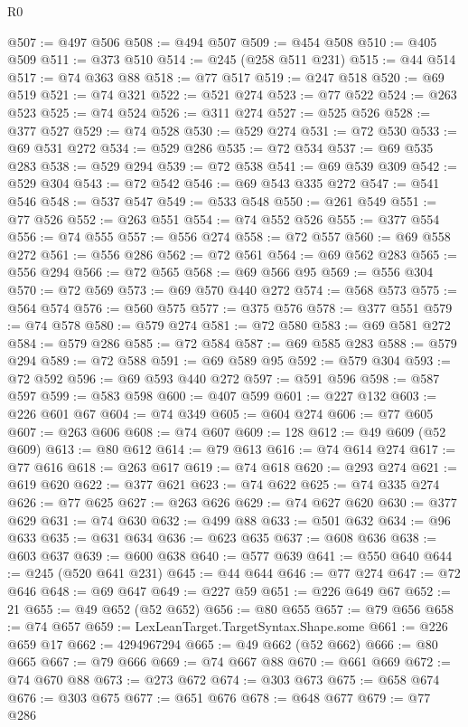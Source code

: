 \begin{lexlean}{R0}
\begin{coremodule}
@507 := @497 @506
@508 := @494 @507
@509 := @454 @508
@510 := @405 @509
@511 := @373 @510
@514 := @245 (@258 @511 @231)
@515 := @44 @514
@517 := @74 @363 @88
@518 := @77 @517
@519 := @247 @518
@520 := @69 @519
@521 := @74 @321
@522 := @521 @274
@523 := @77 @522
@524 := @263 @523
@525 := @74 @524
@526 := @311 @274
@527 := @525 @526
@528 := @377 @527
@529 := @74 @528
@530 := @529 @274
@531 := @72 @530
@533 := @69 @531 @272
@534 := @529 @286
@535 := @72 @534
@537 := @69 @535 @283
@538 := @529 @294
@539 := @72 @538
@541 := @69 @539 @309
@542 := @529 @304
@543 := @72 @542
@546 := @69 @543 @335 @272
@547 := @541 @546
@548 := @537 @547
@549 := @533 @548
@550 := @261 @549
@551 := @77 @526
@552 := @263 @551
@554 := @74 @552 @526
@555 := @377 @554
@556 := @74 @555
@557 := @556 @274
@558 := @72 @557
@560 := @69 @558 @272
@561 := @556 @286
@562 := @72 @561
@564 := @69 @562 @283
@565 := @556 @294
@566 := @72 @565
@568 := @69 @566 @95
@569 := @556 @304
@570 := @72 @569
@573 := @69 @570 @440 @272
@574 := @568 @573
@575 := @564 @574
@576 := @560 @575
@577 := @375 @576
@578 := @377 @551
@579 := @74 @578
@580 := @579 @274
@581 := @72 @580
@583 := @69 @581 @272
@584 := @579 @286
@585 := @72 @584
@587 := @69 @585 @283
@588 := @579 @294
@589 := @72 @588
@591 := @69 @589 @95
@592 := @579 @304
@593 := @72 @592
@596 := @69 @593 @440 @272
@597 := @591 @596
@598 := @587 @597
@599 := @583 @598
@600 := @407 @599
@601 := @227 @132
@603 := @226 @601 @67
@604 := @74 @349
@605 := @604 @274
@606 := @77 @605
@607 := @263 @606
@608 := @74 @607
@609 := 128
@612 := @49 @609 (@52 @609)
@613 := @80 @612
@614 := @79 @613
@616 := @74 @614 @274
@617 := @77 @616
@618 := @263 @617
@619 := @74 @618
@620 := @293 @274
@621 := @619 @620
@622 := @377 @621
@623 := @74 @622
@625 := @74 @335 @274
@626 := @77 @625
@627 := @263 @626
@629 := @74 @627 @620
@630 := @377 @629
@631 := @74 @630
@632 := @499 @88
@633 := @501 @632
@634 := @96 @633
@635 := @631 @634
@636 := @623 @635
@637 := @608 @636
@638 := @603 @637
@639 := @600 @638
@640 := @577 @639
@641 := @550 @640
@644 := @245 (@520 @641 @231)
@645 := @44 @644
@646 := @77 @274
@647 := @72 @646
@648 := @69 @647
@649 := @227 @59
@651 := @226 @649 @67
@652 := 21
@655 := @49 @652 (@52 @652)
@656 := @80 @655
@657 := @79 @656
@658 := @74 @657
@659 := LexLeanTarget.TargetSyntax.Shape.some
@661 := @226 @659 @17
@662 := 4294967294
@665 := @49 @662 (@52 @662)
@666 := @80 @665
@667 := @79 @666
@669 := @74 @667 @88
@670 := @661 @669
@672 := @74 @670 @88
@673 := @273 @672
@674 := @303 @673
@675 := @658 @674
@676 := @303 @675
@677 := @651 @676
@678 := @648 @677
@679 := @77 @286

\end{coremodule}
\end{lexlean}
